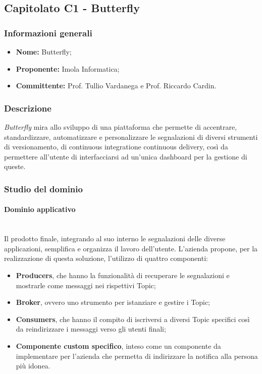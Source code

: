 \subsection{Capitolato C1 - Butterfly}
\subsubsection{Informazioni generali}
\begin{itemize}
\item
\textbf{Nome:} Butterfly;
\item
\textbf{Proponente:} Imola Informatica;
\item
\textbf{Committente:} Prof. Tullio Vardanega e Prof. Riccardo Cardin.
\end{itemize}
\subsubsection{Descrizione}
\textit{Butterfly} mira allo sviluppo di una piattaforma che permette di
 accentrare, standardizzare, automatizzare e personalizzare le segnalazioni di
 diversi strumenti di versionamento, di continuous integration\glosp e continuous delivery\glo , così da permettere all'utente di interfacciarsi ad un'unica dashboard per la gestione di queste.
\subsubsection{Studio del dominio}
\paragraph{Dominio applicativo}\mbox{}\\
Il prodotto finale, integrando al suo interno le segnalazioni delle diverse 
applicazioni, semplifica e organizza il lavoro dell'utente. L'azienda propone,
per la realizzazione di questa soluzione, l'utilizzo di quattro componenti:
\begin{itemize}
	\item \textbf{Producers}, che hanno la funzionalità di recuperare le
	segnalazioni e mostrarle come messaggi nei rispettivi Topic;
	\item \textbf{Broker}, ovvero uno strumento per istanziare e gestire i
	 Topic;
	\item \textbf{Consumers}, che hanno il compito di iscriversi a diversi
	Topic specifici così da reindirizzare i messaggi verso gli utenti finali;
    \item \textbf{Componente custom specifico}, inteso come un componente da
    implementare per l'azienda che permetta di indirizzare la notifica alla
    persona più idonea.
\end{itemize}
